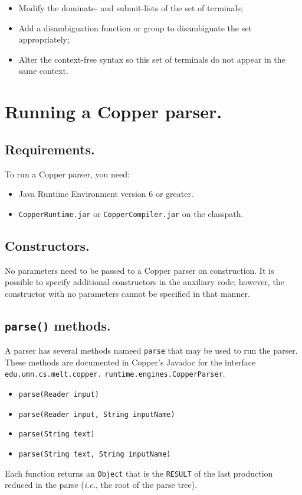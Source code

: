 \documentclass[12pt,english,twoside]{report}
\begin{document}
\begin{itemize}
\item Modify the dominate- and submit-lists of the set of terminals;
\item Add a disambiguation function or group to disambiguate the set appropriately;
\item Alter the context-free syntax so this set of terminals do not appear
in the same context.
\end{itemize}

\chapter{\label{cha:Running-a-Copper-parser.}Running a Copper parser.}

\section{Requirements.}

To run a Copper parser, you need:

\begin{itemize}
\item Java Runtime Environment version 6 or greater.
\item \texttt{CopperRuntime.jar} or \texttt{CopperCompiler.jar} on the classpath.
\end{itemize}

\section{Constructors.}

No parameters need to be passed to a Copper parser on construction.
It is possible to specify additional constructors in the auxiliary
code; however, the constructor with no parameters cannot be specified
in that manner.

\section{\texttt{parse()} methods.}

A parser has several methods nameed \texttt{parse} that may be used to
run the parser. These methods are documented in Copper's Javadoc for
the interface
\texttt{edu.}\texttt{umn.}\texttt{cs.}\texttt{melt.}\texttt{copper.} \texttt{runtime.}\texttt{engines.}\texttt{CopperParser}.

\begin{itemize}
\item \texttt{parse(Reader input)}
\item \texttt{parse(Reader input, String inputName)}
\item \texttt{parse(String text)}
\item \texttt{parse(String text, String inputName)}
\end{itemize}
Each function returns an \texttt{Object} that is the \texttt{RESULT}
of the last production reduced in the parse (\emph{i.e.}, the root
of the parse tree).
\end{document}
